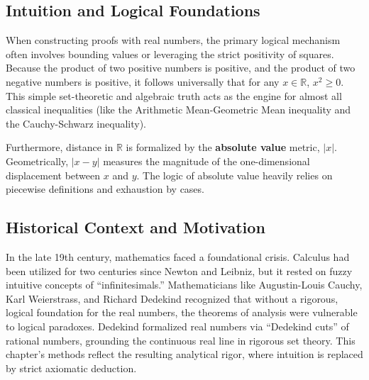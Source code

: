 \documentclass[11pt]{article}
\theoremstyle{definition}
\theoremstyle{remark}
\begin{document}
\subsection{Intuition and Logical Foundations}
When constructing proofs with real numbers, the primary logical mechanism often involves bounding values or leveraging the strict positivity of squares. Because the product of two positive numbers is positive, and the product of two negative numbers is positive, it follows universally that for any $x \in \mathbb{R}$, $x^2 \ge 0$. This simple set-theoretic and algebraic truth acts as the engine for almost all classical inequalities (like the Arithmetic Mean-Geometric Mean inequality and the Cauchy-Schwarz inequality).

Furthermore, distance in $\mathbb{R}$ is formalized by the \textbf{absolute value} metric, $|x|$. Geometrically, $|x - y|$ measures the magnitude of the one-dimensional displacement between $x$ and $y$. The logic of absolute value heavily relies on piecewise definitions and exhaustion by cases.

\subsection{Historical Context and Motivation}
In the late 19th century, mathematics faced a foundational crisis. Calculus had been utilized for two centuries since Newton and Leibniz, but it rested on fuzzy intuitive concepts of ``infinitesimals.'' Mathematicians like Augustin-Louis Cauchy, Karl Weierstrass, and Richard Dedekind recognized that without a rigorous, logical foundation for the real numbers, the theorems of analysis were vulnerable to logical paradoxes. Dedekind formalized real numbers via ``Dedekind cuts'' of rational numbers, grounding the continuous real line in rigorous set theory. This chapter's methods reflect the resulting analytical rigor, where intuition is replaced by strict axiomatic deduction.
\end{document}
